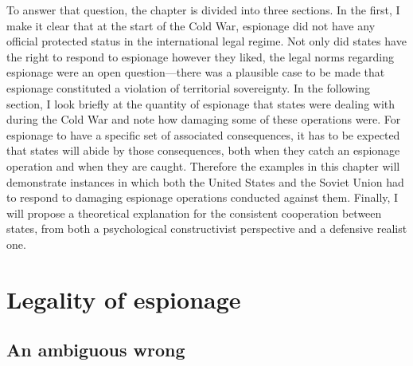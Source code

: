 \documentclass{memoir}
\begin{document}
\begin{refsegment}
To answer that question, the chapter is divided into three sections. In the first, I make it clear that at the start of the Cold War, espionage did not have any official protected status in the international legal regime. Not only did states have the right to respond to espionage however they liked, the legal norms regarding espionage were an open question---there was a plausible case to be made that espionage constituted a violation of territorial sovereignty. In the following section, I look briefly at the quantity of espionage that states were dealing with during the Cold War and note how damaging some of these operations were. For espionage to have a specific set of associated consequences, it has to be expected that states will abide by those consequences, both when they catch an espionage operation and when they are caught. Therefore the examples in this chapter will demonstrate instances in which both the United States and the Soviet Union had to respond to damaging espionage operations conducted against them. Finally, I will propose a theoretical explanation for the consistent cooperation between states, from both a psychological constructivist perspective and a defensive realist one.


\section{Legality of espionage}
\subsection{An ambiguous wrong}


\end{refsegment}
\end{document}
